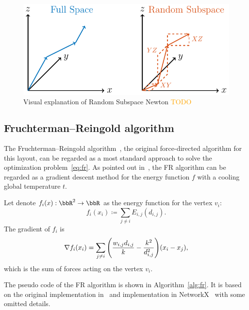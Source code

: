 \documentclass[dvipdfmx,journal]{IEEEtran}
\newcommand{\orange}[1]{\textcolor{orange}{#1}}
\newcommand{\defeq}{\coloneqq}
\begin{document}
\begin{figure}[t]
\begin{minipage}{0.49\hsize}
  \end{minipage}
  \begin{minipage}{0.49\hsize}
    \centering
    \includegraphics[width=\columnwidth]{randomSubspace.pdf}
    \caption{
      Visual explanation of Random Subspace Newton
      \orange{TODO}
    }
  \end{minipage}
\end{figure}

\subsection{Fruchterman--Reingold algorithm}\label{ssec:frAlgorithm}

The Fruchterman--Reingold algorithm~\cite{fruchtermanGraphDrawingForcedirected1991}, the original force-directed algorithm for this layout, can be regarded as a most standard approach to solve the optimization problem~\eqref{eq:fr}.
As pointed out in~\cite{tunkelang1999numerical}, the FR algorithm can be regarded as a gradient descent method for the energy function $f$ with a cooling global temperature $t$.

Let denote $f_i(x): \bbR^2 \to \bbR$ as the energy function for the vertex $v_i$:
\begin{equation*}
  f_i(x_i) \defeq \sum_{j \neq i} E_{i,j}(d_{i,j}).
\end{equation*}
The gradient of $f_i$ is
\begin{equation}\label{eq:gradientFi}
  \nabla f_i(x_i) = \sum_{j \neq i} \qty(\frac{w_{i,j}d_{i,j}}{k} - \frac{k^2}{d_{i,j}^2}) (x_i-x_j),
\end{equation}
which is the sum of forces acting on the vertex $v_i$.

The pseudo code of the FR algorithm is shown in Algorithm~\ref{alg:fr}. It is based on the original implementation in~\cite{fruchtermanGraphDrawingForcedirected1991} and implementation in NetworkX~\cite{osti_960616} with some omitted details.
\end{document}
